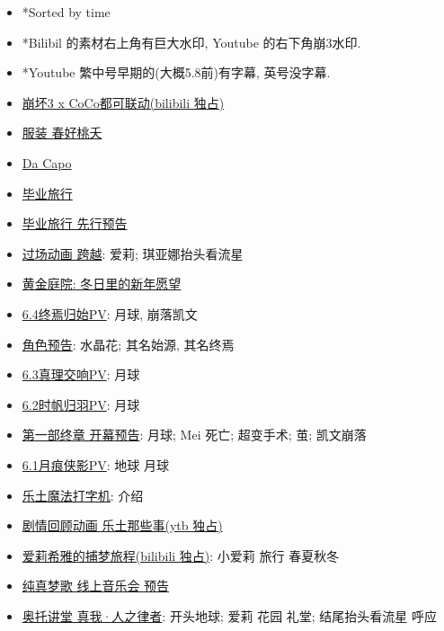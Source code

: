 \documentclass[a4paper]{article}
\begin{document}
\begin{itemize}
    \item *Sorted by time
    \item *Bilibil 的素材右上角有巨大水印, Youtube 的右下角崩3水印.
    \item *Youtube 繁中号早期的(大概5.8前)有字幕, 英号没字幕.
    \item \href{https://www.bilibili.com/video/BV1j84y1D7uf/}{崩坏3 x CoCo都可联动(bilibili 独占)}
    \item \href{https://www.bilibili.com/video/BV1tP411f7BY/}{服装 春好桃夭}
    \item \href{https://www.bilibili.com/video/BV1aM4y1R77W/}{Da Capo}
    \item \href{https://www.bilibili.com/video/BV1Kj411g7Lu/}{毕业旅行}
    \item \href{https://www.bilibili.com/video/BV1BD4y1g7Yp/}{毕业旅行 先行预告}
    \item \href{https://www.bilibili.com/video/BV1784y1p7vM/}{过场动画 跨越}: 爱莉; 琪亚娜抬头看流星
    \item \href{https://www.bilibili.com/video/BV1oA411o7zD/}{黄金庭院: 冬日里的新年愿望}
    \item \href{https://www.bilibili.com/video/BV12g411H7sC/}{6.4终焉归始PV}: 月球, 崩落凯文
    \item \href{https://www.bilibili.com/video/BV1jW4y1K7mE/}{角色预告}: 水晶花; 其名始源, 其名终焉
    \item \href{https://www.bilibili.com/video/BV12g411H7sC/}{6.3真理交响PV}: 月球
    \item \href{https://www.bilibili.com/video/BV1vY411f7qz/}{6.2时帆归羽PV}: 月球
    \item \href{https://www.bilibili.com/video/BV1eV4y1K7c7/}{第一部终章 开幕预告}: 月球; Mei 死亡; 超变手术; 茧; 凯文崩落
    \item \href{https://www.bilibili.com/video/BV1dd4y1B7Xb/}{6.1月痕侠影PV}: 地球 月球
    \item \href{https://www.bilibili.com/video/BV1f24y1d7tP/}{乐土魔法打字机}: 介绍
    \item \href{https://www.youtube.com/watch?v=p_aPQhXCVCM}{剧情回顾动画 乐土那些事(ytb 独占)}
    \item \href{https://www.bilibili.com/video/BV1ZW4y1t7Zf/}{爱莉希雅的捕梦旅程(bilibili 独占)}: 小爱莉 旅行 春夏秋冬
    \item \href{https://www.bilibili.com/bangumi/play/ep672059/}{纯真梦歌 线上音乐会 预告}
    \item \href{https://www.bilibili.com/video/BV1q14y147EC/}{奥托讲堂 真我·人之律者}: 开头地球; 爱莉 花园 礼堂; 结尾抬头看流星 呼应

\end{itemize}
\end{document}
